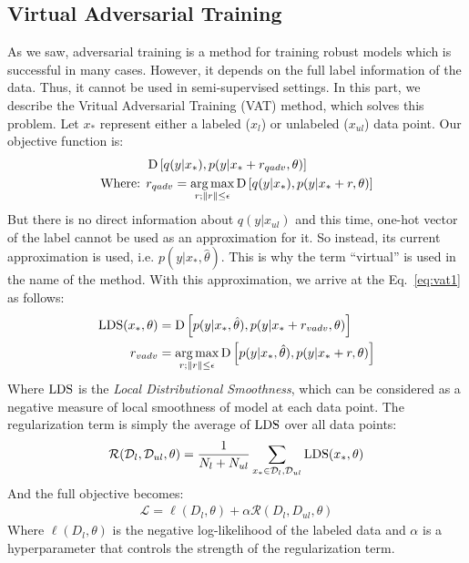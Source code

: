 \documentclass[paper=a4, fontsize=11pt]{scrartcl}
\numberwithin{equation}{section}		%
\numberwithin{figure}{section}			%
\numberwithin{table}{section}				%
\begin{document}
\subsection{Virtual Adversarial Training}
As we saw, adversarial training is a method for training robust models which is successful in many cases.
However, it depends on the full label information of the data. 
Thus, it cannot be used in semi-supervised settings.
In this part, we describe the Vritual Adversarial Training (VAT) method, which solves this problem.
Let \(x_*\) represent either a labeled (\(x_l\)) or unlabeled (\(x_{ul}\)) data point.
Our objective function is:
\begin{align}
&\operatorname*{D} \left[q(y | x_*), p(y | x_* + r_{qadv}, \theta)\right]\\
\text{Where: } &r_{qadv} = \operatorname*{arg\,max}_{r; \left\lVert r\right\rVert \le \epsilon} \operatorname*{D} \left[q(y | x_*), p(y | x_* + r, \theta)\right]
\end{align}
But there is no direct information about \(q(y | x_{ul})\) and this time, one-hot vector of the label cannot be used as an approximation for it.
So instead, its current approximation is used, i.e. \(p(y | x_*, \hat{\theta})\).
This is why the term ``virtual'' is used in the name of the method.
With this approximation, we arrive at the Eq.~\eqref{eq:vat1} as follows:
\begin{align}
\label{eq:vat1}
\operatorname*{LDS}(x_*, \theta) &= \operatorname*{D} \left[p(y | x_*, \hat{\theta}), p(y | x_* + r_{vadv}, \theta)\right]\\
r_{vadv} &= \operatorname*{arg\,max}_{r; \left\lVert r\right\rVert \le \epsilon} \operatorname*{D} \left[p(y | x_*, \hat{\theta}), p(y | x_* + r, \theta)\right]
\end{align}
Where \(\operatorname*{LDS}\) is the \textit{Local Distributional Smoothness}, which can be considered as a negative measure of local smoothness of model at each data point.
The regularization term is simply the average of \(\operatorname*{LDS}\) over all data points:
\begin{align}
\mathcal{R}(\mathcal{D}_l, \mathcal{D}_{ul}, \theta) = \frac{1}{N_l + N_{ul}} \sum_{x_* \in \mathcal{D}_l, \mathcal{D}_{ul}} \operatorname*{LDS}(x_*, \theta)
\end{align}
And the full objective becomes:
\begin{align}
\mathcal{L} = \ell(D_l, \theta) + \alpha \mathcal{R}(D_l, D_{ul}, \theta)
\end{align}
Where \(\ell(D_l, \theta)\) is the negative log-likelihood of the labeled data and \(\alpha\) is a hyperparameter that controls the strength of the regularization term.
\end{document}
